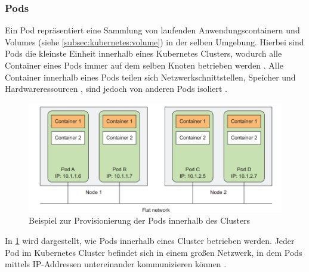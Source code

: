 \subsubsection{Pods}
\label{subsec:kubernetes:pods}
Ein Pod repräsentiert eine Sammlung von laufenden Anwendungscontainern 
und Volumes (siehe \ref{subsec:kubernetes:volume}) in der selben Umgebung.
Hierbei sind Pods die kleinste Einheit innerhalb eines Kubernetes Clusters, wodurch alle Container eines Pods
immer auf dem selben Knoten betrieben werden \cite{Burns2019}.
Alle Container innerhalb eines Pods teilen sich Netzwerkschnittstellen, Speicher und Hardwareressourcen \cite{kubernetesPods},
sind jedoch von anderen Pods isoliert \cite{Burns2019}.

\begin{figure}[h]
  \includegraphics[width=\textwidth]{gfx/chapters/2_grundlagen/kubernetes_network.png}
  \caption{Beispiel zur Provisionierung der Pods innerhalb des Clusters}
  \label{fig:kubernetes_network}
\end{figure}

In \ref{fig:kubernetes_network} wird dargestellt, wie Pods innerhalb eines Cluster betrieben werden.
Jeder Pod im Kubernetes Cluster befindet sich in einem großen Netzwerk, in dem Pods mittels IP-Addressen untereinander 
kommunizieren können \cite{Marko2018}. 


